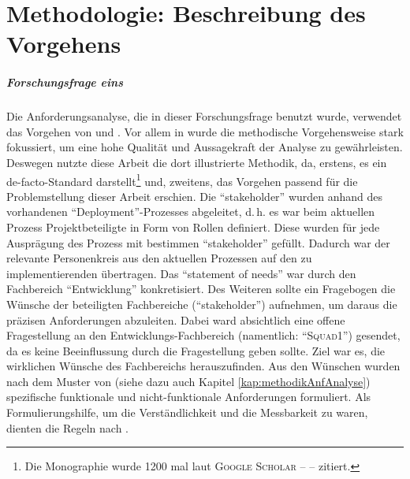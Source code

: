 \chapter{Methodologie: Beschreibung des Vorgehens}\label{kap:methodology}
\paragraph{Forschungsfrage eins}
Die Anforderungsanalyse, die in dieser Forschungsfrage benutzt wurde, verwendet das Vorgehen von \cite{hull_requirements_2011} und \cite{partsch_requirements-engineering_2010}. Vor allem in \cite{hull_requirements_2011} wurde die methodische Vorgehensweise stark fokussiert, um eine hohe Qualität und Aussagekraft der Analyse zu gewährleisten. Deswegen nutzte diese Arbeit die dort illustrierte Methodik, da, erstens, es ein de-facto-Standard darstellt\footnote{Die Monographie wurde 1200 mal laut \textsc{Google Scholar} -- \cite{google_llc_google_2020} -- zitiert.} und, zweitens, das Vorgehen passend für die Problemstellung dieser Arbeit erschien. Die \enquote{stakeholder} wurden anhand des vorhandenen \enquote{Deployment}-Prozesses abgeleitet, d.\,h. es war beim aktuellen Prozess Projektbeteiligte in Form von Rollen definiert. Diese wurden für jede Ausprägung des Prozess mit bestimmen \enquote{stakeholder} gefüllt. Dadurch war der relevante Personenkreis aus den aktuellen Prozessen auf den zu implementierenden übertragen. Das \enquote{statement of needs} war durch den Fachbereich \enquote{Entwicklung} konkretisiert. Des Weiteren sollte ein Fragebogen die Wünsche der beteiligten Fachbereiche (\enquote{stakeholder}) aufnehmen, um daraus die präzisen Anforderungen abzuleiten. Dabei ward absichtlich eine offene Fragestellung an den Entwicklungs-Fachbereich (namentlich: \enquote{\textsc{Squad1}}) gesendet, da es keine Beeinflussung durch die Fragestellung geben sollte. Ziel war es, die wirklichen Wünsche des Fachbereichs herauszufinden. Aus den Wünschen wurden nach dem Muster von \cite[vgl.][S.\,28]{hull_requirements_2011} (siehe dazu auch Kapitel \vref{kap:methodikAnfAnalyse}) spezifische funktionale und nicht-funktionale Anforderungen formuliert. Als Formulierungshilfe, um die Verständlichkeit und die Messbarkeit zu waren, dienten die Regeln nach \cite{rupp_formulierungsregel_2020}. 
\par
